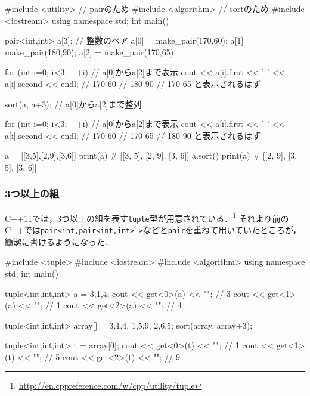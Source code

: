\begin{cbox}
#include <utility> // pairのため
#include <algorithm> // sortのため
#include <iostream>
using namespace std;
int main() {
  pair<int,int> a[3]; // 整数のペア
  a[0] = make_pair(170,60);
  a[1] = make_pair(180,90);
  a[2] = make_pair(170,65);

  for (int i=0; i<3; ++i) // a[0]からa[2]まで表示
    cout << a[i].first << ' ' << a[i].second << endl;
  // 170 60
  // 180 90
  // 170 65 と表示されるはず

  sort(a, a+3); // a[0]からa[2]まで整列

  for (int i=0; i<3; ++i) // a[0]からa[2]まで表示
    cout << a[i].first << ' ' << a[i].second << endl;
  // 170 60
  // 170 65
  // 180 90 と表示されるはず
}
\end{cbox}

\begin{pybox}
a = [[3,5],[2,9],[3,6]]
print(a) # [[3, 5], [2, 9], [3, 6]]
a.sort()
print(a) # [[2, 9], [3, 5], [3, 6]]
\end{pybox}

\subsubsection{3つ以上の組}
C++11では，3つ以上の組を表す\texttt{tuple}型が用意されている．\footnote{\url{http://en.cppreference.com/w/cpp/utility/tuple}}
それより前のC++では\texttt{pair<int,pair<int,int> >}などと\texttt{pair}を重ねて用いていたところが，簡潔に書けるようになった．

\begin{c11box}[emph={tuple}]
#include <tuple>
#include <iostream>
#include <algorithm>
using namespace std;
int main() {
  tuple<int,int,int> a = {3,1,4};
  cout << get<0>(a) << "\n";	// 3
  cout << get<1>(a) << "\n";	// 1
  cout << get<2>(a) << "\n";	// 4

  tuple<int,int,int> array[] = {{3,1,4}, {1,5,9}, {2,6,5}};
  sort(array, array+3);
  
  tuple<int,int,int> t = array[0];
  cout << get<0>(t) << "\n";	// 1
  cout << get<1>(t) << "\n";	// 5
  cout << get<2>(t) << "\n";	// 9
}
\end{c11box}



